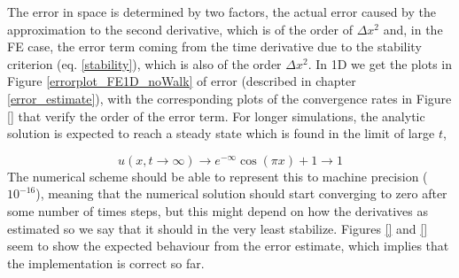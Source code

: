 The error in space is determined by two factors, the actual error caused by the approximation to the second derivative, which is of the order of $\Delta x^2$ and, in the FE case, the error term coming from the time derivative due to the stability criterion (eq. \ref{stability}), which is also of the order $\Delta x^2$. 
In 1D we get the plots in Figure \ref{errorplot_FE1D_noWalk} of error (described in chapter \ref{error_estimate}), with the corresponding plots of the convergence rates in Figure \ref{} that verify the order of the error term.
For longer simulations, the analytic solution is expected to reach a steady state which is found in the limit of large $t$, 

\begin{equation}
 u(x,t\to\infty) \to e^{-\infty}\cos(\pi x) +1 \to 1
\end{equation}
The numerical scheme should be able to represent this to machine precision ($10^{-16}$), meaning that the numerical solution should start converging to zero after some number of times steps, but this might depend on how the derivatives as estimated so we say that it should in the very least stabilize. 
Figures \ref{} and \ref{} seem to show the expected behaviour from the error estimate, which implies that the implementation is correct so far.

